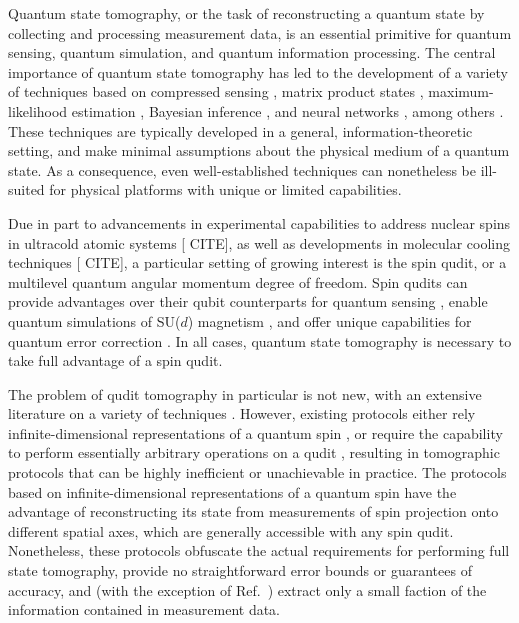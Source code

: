 \documentclass[notitlepage,twocolumn]{revtex4-2}
\newcommand{\red}[1]{{\color{red} #1}}
\begin{document}
Quantum state tomography, or the task of reconstructing a quantum state by collecting and processing measurement data, is an essential primitive for quantum sensing, quantum simulation, and quantum information processing.
The central importance of quantum state tomography has led to the development of a variety of techniques based on compressed sensing \cite{gross2010quantum}, matrix product states \cite{cramer2010efficient}, maximum-likelihood estimation \cite{smolin2012efficient}, Bayesian inference \cite{huszar2012adaptive}, and neural networks \cite{torlai2018neuralnetwork}, among others \cite{christandl2012reliable, qi2013quantum, opatrny1997leastsquares}.
These techniques are typically developed in a general, information-theoretic setting, and make minimal assumptions about the physical medium of a quantum state.
As a consequence, even well-established techniques can nonetheless be ill-suited for physical platforms with unique or limited capabilities.

Due in part to advancements in experimental capabilities to address nuclear spins in ultracold atomic systems [\red{CITE}], as well as developments in molecular cooling techniques [\red{CITE}], a particular setting of growing interest is the spin qudit, or a multilevel quantum angular momentum degree of freedom.
Spin qudits can provide advantages over their qubit counterparts for quantum sensing \cite{evrard2019enhanced}, enable quantum simulations of SU($d$) magnetism \cite{banerjee2013atomic, cazalilla2014ultracold, zhang2014spectroscopic, scazza2014observation, goban2018emergence}, and offer unique capabilities for quantum error correction \cite{albert2020robust, gross2020encoding}.
In all cases, quantum state tomography is necessary to take full advantage of a spin qudit.

The problem of qudit tomography in particular is not new, with an extensive literature on a variety of techniques \cite{manko1997spin, schmied2011tomographic, evrard2019enhanced, flammia2005minimal, thew2002qudit, salazar2012quantum, sosa-martinez2017quantum, ha2018minimal, stefano2019set, palici2020oam}.
However, existing protocols either rely infinite-dimensional representations of a quantum spin \cite{manko1997spin, schmied2011tomographic, evrard2019enhanced}, or require the capability to perform essentially arbitrary operations on a qudit \cite{thew2002qudit, flammia2005minimal, salazar2012quantum, sosa-martinez2017quantum, ha2018minimal, stefano2019set, palici2020oam}, resulting in tomographic protocols that can be highly inefficient or unachievable in practice.
The protocols based on infinite-dimensional representations of a quantum spin have the advantage of reconstructing its state from measurements of spin projection onto different spatial axes, which are generally accessible with any spin qudit.
Nonetheless, these protocols obfuscate the actual requirements for performing full state tomography, provide no straightforward error bounds or guarantees of accuracy, and (with the exception of Ref.~\cite{schmied2011tomographic}) extract only a small faction of the information contained in measurement data.
\end{document}
